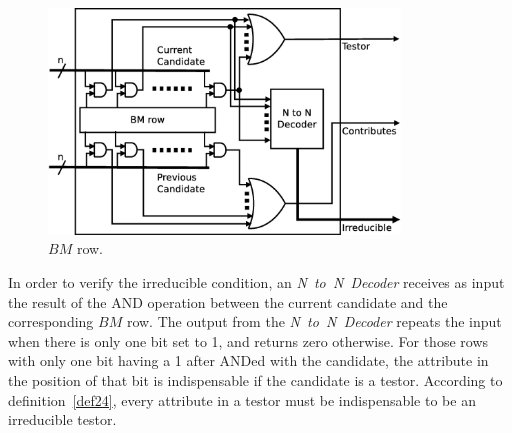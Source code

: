 \documentclass[authoryear,preprint,review,12pt]{elsarticle}
\begin{document}
\begin{figure}[htb]
    \begin{center}
        \includegraphics[height=6cm]{BM_row.eps}
    \end{center}
\caption{$BM$ row.}
\label{fig:row}
\end{figure}

In order to verify the irreducible condition, an \textit{N~to~N~Decoder}
receives as input the result of the AND operation between the current candidate and the corresponding $BM$ row.
The output from the \textit{N~to~N~Decoder} repeats the input when there is only one bit set
to 1, and returns zero otherwise. For those rows with only one bit having a 1 after ANDed with the candidate,
the attribute in the position of that bit is indispensable if the candidate is a testor.
According to definition~\ref{def24}, every attribute in a testor must be indispensable to be an
irreducible testor. %
\end{document}
